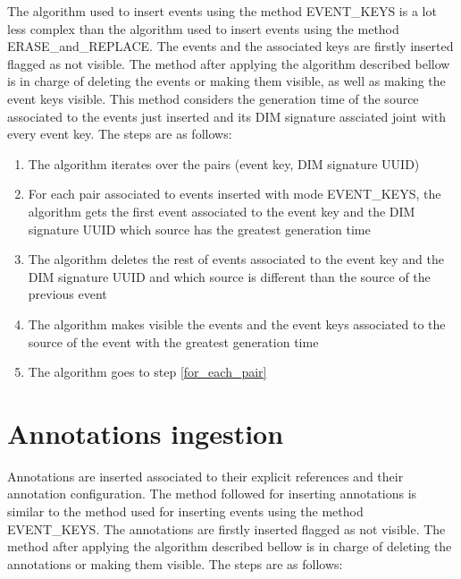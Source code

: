 The algorithm used to insert events using the method EVENT\_KEYS is a lot less complex than the algorithm used to insert events using the method ERASE\_and\_REPLACE.
The events and the associated keys are firstly inserted flagged as not visible. The method after applying the algorithm described bellow is in charge of deleting the events or making them visible, as well as making the event keys visible.
This method considers the generation time of the source associated to the events just inserted and its DIM signature assciated joint with every event key.
The steps are as follows:

\begin{enumerate}

\item The algorithm iterates over the pairs (event key, DIM signature UUID)
\item \label{for_each_pair} For each pair associated to events inserted with mode EVENT\_KEYS, the algorithm gets the first event associated to the event key and the DIM signature UUID which source has the greatest generation time
\item The algorithm deletes the rest of events associated to the event key and the DIM signature UUID and which source is different than the source of the previous event
\item The algorithm makes visible the events and the event keys associated to the source of the event with the greatest generation time
\item The algorithm goes to step \ref{for_each_pair}
\end{enumerate}

\section{Annotations ingestion}

Annotations are inserted associated to their explicit references and their annotation configuration.
The method followed for inserting annotations is similar to the method used for inserting events using the method EVENT\_KEYS.
The annotations are firstly inserted flagged as not visible. The method after applying the algorithm described bellow is in charge of deleting the annotations or making them visible.
The steps are as follows:

